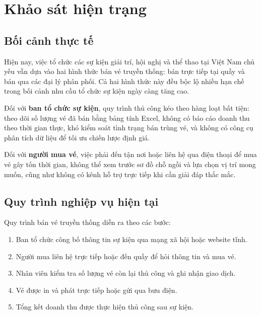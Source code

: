 \documentclass[../main.tex]{subfiles}
\begin{document}
\section{Khảo sát hiện trạng}

\subsection{Bối cảnh thực tế}

Hiện nay, việc tổ chức các sự kiện giải trí, hội nghị và thể thao tại Việt Nam chủ yếu vẫn dựa vào hai hình thức bán vé truyền thống: bán trực tiếp tại quầy và bán qua các đại lý phân phối. Cả hai hình thức này đều bộc lộ nhiều hạn chế trong bối cảnh nhu cầu tổ chức sự kiện ngày càng tăng cao.

Đối với \textbf{ban tổ chức sự kiện}, quy trình thủ công kéo theo hàng loạt bất tiện: theo dõi số lượng vé đã bán bằng bảng tính Excel, không có báo cáo doanh thu theo thời gian thực, khó kiểm soát tình trạng bán trùng vé, và không có công cụ phân tích dữ liệu để tối ưu chiến lược định giá.

Đối với \textbf{người mua vé}, việc phải đến tận nơi hoặc liên hệ qua điện thoại để mua vé gây tốn thời gian, không thể xem trước sơ đồ chỗ ngồi và lựa chọn vị trí mong muốn, cũng như không có kênh hỗ trợ trực tiếp khi cần giải đáp thắc mắc.

\subsection{Quy trình nghiệp vụ hiện tại}

Quy trình bán vé truyền thống diễn ra theo các bước:

\begin{enumerate}
    \item Ban tổ chức công bố thông tin sự kiện qua mạng xã hội hoặc website tĩnh.
    \item Người mua liên hệ trực tiếp hoặc đến quầy để hỏi thông tin và mua vé.
    \item Nhân viên kiểm tra số lượng vé còn lại thủ công và ghi nhận giao dịch.
    \item Vé được in và phát trực tiếp hoặc gửi qua bưu điện.
    \item Tổng kết doanh thu được thực hiện thủ công sau sự kiện.
\end{enumerate}
\end{document}
